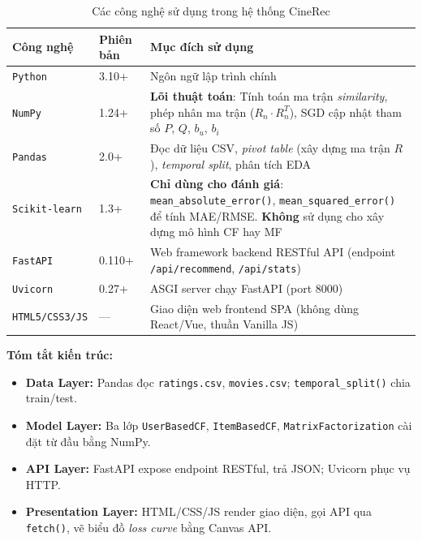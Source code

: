\documentclass[../BTL.tex]{subfiles}
\begin{document}
\begin{table}[H]
    \centering
    \caption{Các công nghệ sử dụng trong hệ thống CineRec}
    \label{tab:tech}
    \begin{tabular}{l l p{6.8cm}}
        \toprule
        \textbf{Công nghệ} & \textbf{Phiên bản} & \textbf{Mục đích sử dụng} \\
        \midrule
        \texttt{Python}       & 3.10+  & Ngôn ngữ lập trình chính \\
        \texttt{NumPy}        & 1.24+  & \textbf{Lõi thuật toán}: Tính toán ma trận
                                \textit{similarity}, phép nhân ma trận
                                ($R_n \cdot R_n^T$), SGD cập nhật tham số
                                $P$, $Q$, $b_u$, $b_i$ \\
        \texttt{Pandas}       & 2.0+   & Đọc dữ liệu CSV, \textit{pivot table}
                                (xây dựng ma trận $R$), \textit{temporal split},
                                phân tích EDA \\
        \texttt{Scikit-learn} & 1.3+   & \textbf{Chỉ dùng cho đánh giá}:
                                \texttt{mean\_absolute\_error()},
                                \texttt{mean\_squared\_error()} để tính
                                MAE/RMSE. \textbf{Không} sử dụng cho xây
                                dựng mô hình CF hay MF \\
        \texttt{FastAPI}      & 0.110+ & Web framework backend RESTful API (endpoint
                                \texttt{/api/recommend}, \texttt{/api/stats}) \\
        \texttt{Uvicorn}      & 0.27+  & ASGI server chạy FastAPI (port 8000) \\
        \texttt{HTML5/CSS3/JS} & ---   & Giao diện web frontend SPA
                                (không dùng React/Vue, thuần Vanilla JS) \\
        \bottomrule
    \end{tabular}
\end{table}

\textbf{Tóm tắt kiến trúc:}
\begin{itemize}[itemsep=0.3em]
    \item \textbf{Data Layer:} Pandas đọc \texttt{ratings.csv}, \texttt{movies.csv};
          \texttt{temporal\_split()} chia train/test.
    \item \textbf{Model Layer:} Ba lớp \texttt{UserBasedCF}, \texttt{ItemBasedCF},
          \texttt{MatrixFactorization} cài đặt từ đầu bằng NumPy.
    \item \textbf{API Layer:} FastAPI expose endpoint RESTful, trả JSON; Uvicorn
          phục vụ HTTP.
    \item \textbf{Presentation Layer:} HTML/CSS/JS render giao diện, gọi API qua
          \texttt{fetch()}, vẽ biểu đồ \textit{loss curve} bằng Canvas API.
\end{itemize}
\end{document}
